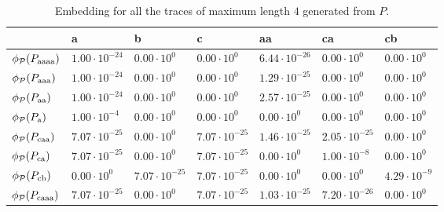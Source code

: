 \begin{table}[!t]
	\centering
	\caption{Embedding for all the traces of maximum length $4$ generated from $P$.}\label{tab:emb2}
	\begin{tabular}{l|l|l|l|l|l|l|}
		\toprule
		& a    & b                                                   & c    & aa   & ca   & cb   \\
		\midrule
		
		
		$\phi_{\mathcal{P}}(P_\textup{aaaa})$ & $1.00\cdot 10^{-24}$ & $0.00\cdot 10^{0}$ & $0.00\cdot 10^{0}$& $6.44\cdot 10^{-26}$& $0.00\cdot 10^{0}$& $0.00\cdot 10^{0}$\\
		$\phi_{\mathcal{P}}(P_\textup{aaa})$ & $1.00\cdot 10^{-24}$ & $0.00\cdot 10^{0}$ & $0.00\cdot 10^{0}$& $1.29\cdot 10^{-25}$& $0.00\cdot 10^{0}$& $0.00\cdot 10^{0}$\\
		$\phi_{\mathcal{P}}(P_\textup{aa})$ & $1.00\cdot 10^{-24}$ & $0.00\cdot 10^{0}$ & $0.00\cdot 10^{0}$& $2.57\cdot 10^{-25}$& $0.00\cdot 10^{0}$& $0.00\cdot 10^{0}$\\
		$\phi_{\mathcal{P}}(P_\textup{a})$ & $1.00\cdot 10^{-4}$ & $0.00\cdot 10^{0}$ & $0.00\cdot 10^{0}$& $0.00\cdot 10^{0}$& $0.00\cdot 10^{0}$& $0.00\cdot 10^{0}$\\
		$\phi_{\mathcal{P}}(P_\textup{caa})$ & $7.07\cdot 10^{-25}$ & $0.00\cdot 10^{0}$ & $7.07\cdot 10^{-25}$& $1.46\cdot 10^{-25}$& $2.05\cdot 10^{-25}$& $0.00\cdot 10^{0}$\\
		$\phi_{\mathcal{P}}(P_\textup{ca})$ & $7.07\cdot 10^{-25}$ & $0.00\cdot 10^{0}$ & $7.07\cdot 10^{-25}$& $0.00\cdot 10^{0}$& $1.00\cdot 10^{-8}$& $0.00\cdot 10^{0}$\\
		$\phi_{\mathcal{P}}(P_\textup{cb})$ &  $0.00\cdot 10^{0}$ & $7.07\cdot 10^{-25}$ & $7.07\cdot 10^{-25}$& $0.00\cdot 10^{0}$&  $0.00\cdot 10^{0}$ & $4.29\cdot 10^{-9}$\\
		$\phi_{\mathcal{P}}(P_\textup{caaa})$  & $7.07\cdot 10^{-25}$ &  $0.00\cdot 10^{0}$ & $7.07\cdot 10^{-25}$& $1.03\cdot 10^{-25}$&  $7.20\cdot 10^{-26}$ & $0.00\cdot 10^{0}$\\
		\bottomrule
	\end{tabular}
\end{table}
